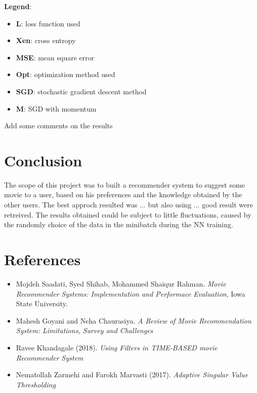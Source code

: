 \documentclass{article}
\begin{document}
\textbf{Legend}:
    \begin{itemize}
        \item \textbf{L}: loss function used
        \item \textbf{Xen}: cross entropy
        \item \textbf{MSE}: mean square error
        \item \textbf{Opt}: optimization method used
        \item \textbf{SGD}: stochastic gradient descent method
        \item \textbf{M}: SGD with momentum
    \end{itemize}
Add some comments on the results


\section{Conclusion}
The scope of this project was to built a recommender system to suggest some movie to a user, based on his preferences and the knowledge obtained by the other users. The best approch resulted was ... but also using ... good result were retreived.
The results obtained could be subject to little fluctuations, caused by the randomly choice of the data in the minibatch during the NN training. 

\section{References}
\begin{itemize}
      \item Mojdeh Saadati, Syed Shihab, Mohammed Shaiqur Rahman. \textsl{Movie Recommender Systems: Implementation and Performace Evaluation}, Iowa State University.
      \item Mahesh Goyani and Neha Chaurasiya. \textsl{A Review of Movie Recommendation System: Limitations, Survey and Challenges}
      \item Ravee Khandagale (2018). \textsl{Using Filters in TIME-BASED movie Recommender System}
      \item Nematollah Zarmehi and Farokh Marvasti (2017). \textsl{Adaptive Singular Value Thresholding}
\end{itemize}
\end{document}
